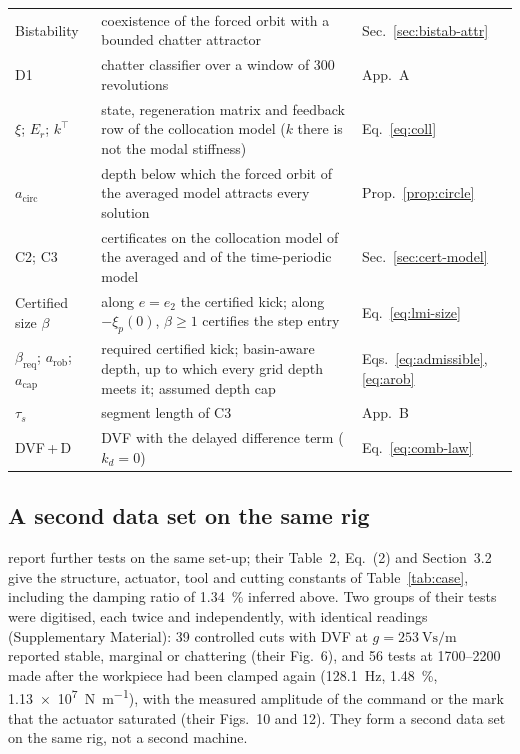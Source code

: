 \begin{table}[!tbp]
\begin{tabular}{@{}>{\raggedright\arraybackslash}p{}>{\raggedright\arraybackslash}p{}>{\raggedright\arraybackslash}p{}@{}}
    Bistability & coexistence of the forced orbit with a bounded chatter attractor & Sec.~\ref{sec:bistab-attr}\\
    D1 & chatter classifier over a window of 300 revolutions & App.~A\\
    $\xi$; $E_r$; $k^\top$ & state, regeneration matrix and feedback row of the collocation model ($k$ there is not the modal stiffness) & Eq.~\eqref{eq:coll}\\
    $a_{\mathrm{circ}}$ & depth below which the forced orbit of the averaged model attracts every solution & Prop.~\ref{prop:circle}\\
    C2; C3 & certificates on the collocation model of the averaged and of the time-periodic model & Sec.~\ref{sec:cert-model}\\
    Certified size $\beta$ & along $e=e_2$ the certified kick; along $-\xi_p(0)$, $\beta\ge1$ certifies the step entry & Eq.~\eqref{eq:lmi-size}\\
    $\beta_{\mathrm{req}}$; $a_{\mathrm{rob}}$; $a_{\mathrm{cap}}$ & required certified kick; basin-aware depth, up to which every grid depth meets it; assumed depth cap & Eqs.~\eqref{eq:admissible}, \eqref{eq:arob}\\
    $\tau_s$ & segment length of C3 & App.~B\\
    DVF\,+\,D & DVF with the delayed difference term ($k_d=0$) & Eq.~\eqref{eq:comb-law}\\
    \bottomrule
  \end{tabular}
\end{table}

\subsection{A second data set on the same rig}\label{sec:model-second}

\citet{ozsoy2025frequency} report further tests on the same set-up; their Table~2, Eq.~(2) and Section~3.2 give the structure, actuator, tool and cutting constants of Table~\ref{tab:case}, including the damping ratio of \SI{1.34}{\percent} inferred above. Two groups of their tests were digitised, each twice and independently, with identical readings (Supplementary Material): 39 controlled cuts with DVF at $g=\SI{253}{\volt\second\per\metre}$ reported stable, marginal or chattering (their Fig.~6), and 56 tests at 1700--\SI{2200}{\rpm} made after the workpiece had been clamped again (\SI{128.1}{\hertz}, \SI{1.48}{\percent}, \SI{1.13e7}{\newton\per\metre}), with the measured amplitude of the command or the mark that the actuator saturated (their Figs.~10 and 12). They form a second data set on the same rig, not a second machine.

